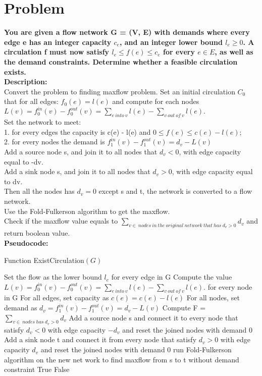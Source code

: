\documentclass{article}
\begin{document}
\clearpage 
\section{Problem \uppercase\expandafter{}}
\textbf{You are given a flow network G = (V, E) with demands where every edge e has an integer capacity $c_e$, and an integer lower bound $l_e \ge 0$. A circulation f must now satisfy $l_e\le f(e)\le c_e$ for every $e \in E$, as well as the demand constraints. Determine whether a feasible circulation exists.}\\
\textbf{\large Description:\\}
Convert the problem to finding maxflow problem. Set an initial circulation $C_0$ that for all edges: $f_0(e) = l(e)$ and compute for each nodes $L(v) =  f_0^{in} (v) - f_0^{out} (v) =  \sum_{e\ into\ v} l(e) - \sum_{v\ out\ of\ v} l(e).$\\
Set the network to meet:\\
1. for every edges the capacity is c(e) - l(e) and $0 \le f(e)\le c(e) - l(e)$;\\
2. for every nodes the demand is $f_1^{in} (v)  - f_1^{out} (v) =  d_v - L(v)$\\
Add a source node s, and join it to all nodes that $d_v<0$, with edge capacity equal to -dv.\\
Add a sink node s, and join it to all nodes that $d_v>0$, with edge capacity equal to dv.\\
Then all the nodes has $d_v=0$ except s and t, the network is converted to a flow network.\\
Use the Fold-Fulkerson algorithm to get the maxflow.\\
Check if the maxflow value equals to $\sum_{v\in\ nodes\ in\ the\ original\ network\ that\ has\ d_v>0} d_v$ and return boolean value.\\
\textbf{\large Pseudocode:\\}
\begin{algorithm}[H]
  \caption{Function ExistCirculation$(G)$}
  \label{alg1}
  \begin{algorithmic}
  \STATE Set the flow as the lower bound $l_e$ for every edge in G
  \STATE Compute the value $L(v) =  f_0^{in} (v) - f_0^{out} (v) =  \sum_{e\ into\ v} l(e) - \sum_{v\ out\ of\ v} l(e).$ for every node in G
  \STATE For all edges, set capacity as $c(e) = c(e) - l(e)$
  \STATE For all nodes, set demand as $d_v = f_1^{in} (v)  - f_1^{out} (v) =  d_v - L(v)$
  \ENDFOR
  \STATE Compute F = $\sum_{v\in\ nodes\ has\ d_v>0} d_v$
  \STATE Add a source node s and connect it to every node that satisfy $d_v<0$ with edge capacity $-d_v$ and reset the joined nodes with demand 0
  \STATE Add a sink node t and connect it from every node that satisfy $d_v>0$ with edge capacity $d_v$ and reset the joined nodes with demand 0
  \STATE run Fold-Fulkerson algorithm on the new net work to find maxflow from s to t without demand constraint
  \RETURN True
  \ELSE
  \RETURN False
  \ENDIF
  \end{algorithmic}
\end{algorithm}
\end{document}
